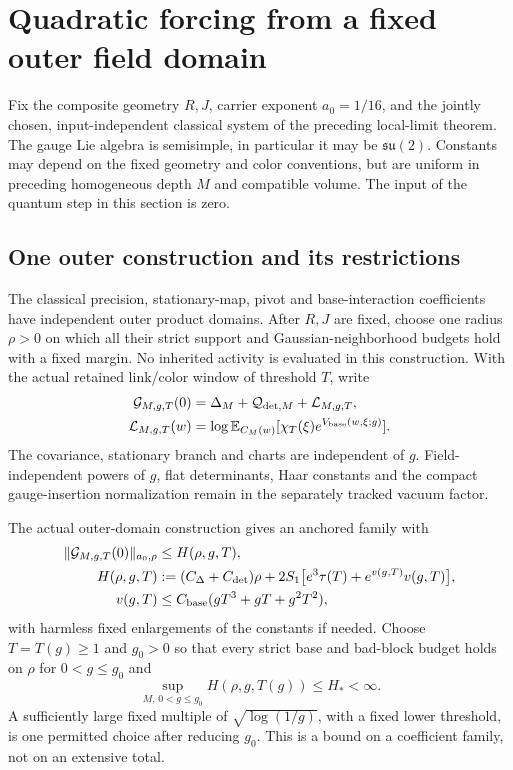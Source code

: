 \section{Quadratic forcing from a fixed outer field domain}
\label{zif-section}

Fix the composite geometry $R,J$, carrier exponent $a_0=1/16$,
and the jointly chosen, input-independent classical system of
the preceding local-limit theorem. The gauge Lie algebra is
semisimple, in particular it may be $\mathfrak{su}(2)$.
Constants may depend on the fixed geometry and color conventions,
but are uniform in preceding homogeneous depth $M$ and compatible
volume. The input of the quantum step in this section is zero.

\subsection{One outer construction and its restrictions}
\label{zif-outer-section}

The classical precision, stationary-map, pivot and base-interaction
coefficients have independent outer product domains. After $R,J$
are fixed, choose one radius $\rho>0$ on which all their strict
support and Gaussian-neighborhood budgets hold with a fixed
margin. No inherited activity is evaluated in this construction.
With the actual retained link/color window of threshold $T$, write
\begin{align}
 \mathcal G_{M,g,T}(0)
   &=\Delta_M+\mathcal Q_{{\rm det},M}
                         +\mathcal L_{M,g,T},\notag\\
 \mathcal L_{M,g,T}(w)
   &=\log\mathbb E_{C_M(w)}
             [\chi_T(\xi)e^{V_{\rm base}(w,\xi;g)}].
 \label{zif-zero-decomposition}
\end{align}
The covariance, stationary branch and charts are independent of
$g$. Field-independent powers of $g$, flat determinants, Haar
constants and the compact gauge-insertion normalization remain
in the separately tracked vacuum factor.

The actual outer-domain construction gives an anchored family
with
\begin{align}
 \|\mathcal G_{M,g,T}(0)\|_{a_0,\rho}
 &\le H(\rho,g,T),\notag\\
 H(\rho,g,T)
 &:=(C_\Delta+C_{\rm det})\rho
       +2S_1\bigl[e^3\tau(T)+e^{v(g,T)}v(g,T)\bigr],\notag\\
 v(g,T)&\le C_{\rm base}(gT^3+gT+g^2T^2),
 \label{zif-outer-bound}
\end{align}
with harmless fixed enlargements of the constants if needed.
Choose $T=T(g)\ge1$ and $g_0>0$ so that every strict base and
bad-block budget holds on $\rho$ for $0<g\le g_0$ and
\begin{equation}
 \sup_{M,\,0<g\le g_0}H(\rho,g,T(g))\le H_*<\infty.
 \label{zif-uniform-outer}
\end{equation}
A sufficiently large fixed multiple of
$\sqrt{\log(1/g)}$, with a fixed lower threshold, is one
permitted choice after reducing $g_0$. This is a bound on a
coefficient family, not on an extensive total.

